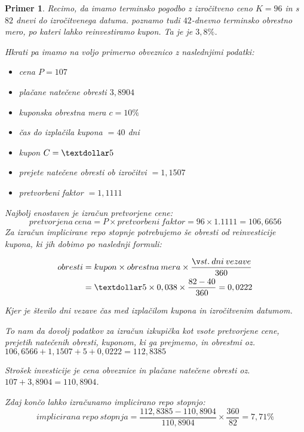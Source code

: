 \documentclass[a4paper, 11pt]{article}
\newtheorem{primer}{Primer}
\begin{document}
\begin{primer}
    Recimo, da imamo terminsko pogodbo z izročitveno ceno $K = 96$ in s $82$ dnevi do izročitvenega
    datuma. poznamo tudi $42$-dnevno terminsko obrestno mero, po kateri lahko reinvestiramo kupon.
    Ta je je $3,8\%$.

    Hkrati pa imamo na voljo primerno obveznico z naslednjimi podatki:

    \begin{itemize}
        \item cena $P = 107$
        \item plačane natečene obresti $3,8904$
        \item kuponska obrestna mera $c = 10\%$
        \item čas do izplačila kupona $ = 40$ dni
        \item kupon $C = \textdollar5$
        \item prejete natečene obresti ob izročitvi $ = 1,1507$
        \item pretvorbeni faktor $ = 1,1111$
    \end{itemize}

    Najbolj enostaven je izračun pretvorjene cene:
    $$ pretvorjena\:cena = P \times pretvorbeni\:faktor = 96 \times 1.1111 = 106,6656 $$
    Za izračun implicirane repo stopnje potrebujemo še obresti od reinvesticije kupona, ki jih
    dobimo po naslednji formuli:
    
    \begin{align*}
        obresti
        &= kupon \times obrestna\:mera \times \frac{št.\:dni\:vezave}{360} \\
        &= \textdollar5 \times 0,038 \times \frac{82 - 40}{360} = 0,0222 
    \end{align*}

    Kjer je število dni vezave čas med izplačilom kupona in izročitvenim datumom. 

    To nam da dovolj podatkov za izračun izkupička kot vsote pretvorjene cene, prejetih natečenih
    obresti, kuponom, ki ga prejmemo, in obrestmi oz. $106,6566 + 1,1507 + 5 + 0,0222 = 112,8385$

    Strošek investicije je cena obveznice in plačane natečene obresti oz. $107 + 3,8904 = 110,8904$.

    Zdaj končo lahko izračunamo implicirano repo stopnjo:
    $$ implicirana\:repo\:stopnja = \frac{112,8385 - 110,8904}{110,8904} \times \frac{360}{82} 
    = 7,71\% $$
    
\end{primer}
\end{document}
